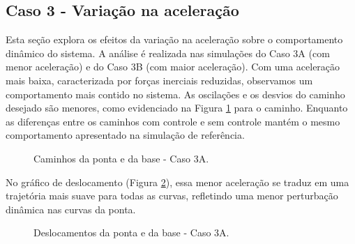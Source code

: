 \subsection{Caso 3 - Variação na aceleração}
Esta seção explora os efeitos da variação na aceleração sobre o comportamento dinâmico do sistema. A análise é realizada nas simulações do Caso 3A (com menor aceleração) e do Caso 3B (com maior aceleração).
Com uma aceleração mais baixa, caracterizada por forças inerciais reduzidas, observamos um comportamento mais contido no sistema. As oscilações e os desvios do caminho desejado são menores, como evidenciado na Figura \ref{fig:3A_cam} para o caminho. Enquanto as diferenças entre os caminhos com controle e sem controle mantém o mesmo comportamento apresentado na simulação de referência.

\begin{figure}[H]
    \centering
    \hfill
    \hfill
    \hfill
    \caption{Caminhos da ponta e da base - Caso 3A.}
    \label{fig:3A_cam}
\end{figure}

No gráfico de deslocamento (Figura \ref{fig:3A_des}), essa menor aceleração se traduz em uma trajetória mais suave para todas as curvas, refletindo uma menor perturbação dinâmica nas curvas da ponta.

\begin{figure}[H]
    \centering
    \hfill
    \caption{Deslocamentos da ponta e da base - Caso 3A.}
    \label{fig:3A_des}
\end{figure}

